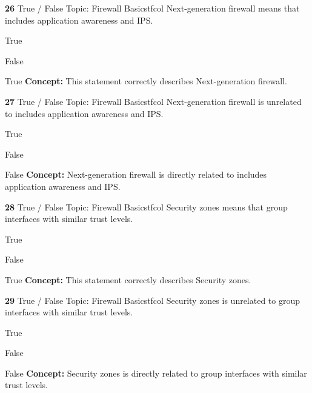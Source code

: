 \documentclass[10pt,a4paper]{article}
\begin{document}
\begin{qcard}{\color{white}\textbf{26} \hfill \small True / False \textbar{} Topic: Firewall Basics}{tfcol}
Next-generation firewall means that includes application awareness and IPS.

\begin{qoptions}
\item True
\item False
\end{qoptions}
\begin{explainbox}{True}
\textbf{Concept:} This statement correctly describes Next-generation firewall.
\end{explainbox}
\end{qcard}

\begin{qcard}{\color{white}\textbf{27} \hfill \small True / False \textbar{} Topic: Firewall Basics}{tfcol}
Next-generation firewall is unrelated to includes application awareness and IPS.

\begin{qoptions}
\item True
\item False
\end{qoptions}
\begin{explainbox}{False}
\textbf{Concept:} Next-generation firewall is directly related to includes application awareness and IPS.
\end{explainbox}
\end{qcard}

\begin{qcard}{\color{white}\textbf{28} \hfill \small True / False \textbar{} Topic: Firewall Basics}{tfcol}
Security zones means that group interfaces with similar trust levels.

\begin{qoptions}
\item True
\item False
\end{qoptions}
\begin{explainbox}{True}
\textbf{Concept:} This statement correctly describes Security zones.
\end{explainbox}
\end{qcard}

\begin{qcard}{\color{white}\textbf{29} \hfill \small True / False \textbar{} Topic: Firewall Basics}{tfcol}
Security zones is unrelated to group interfaces with similar trust levels.

\begin{qoptions}
\item True
\item False
\end{qoptions}
\begin{explainbox}{False}
\textbf{Concept:} Security zones is directly related to group interfaces with similar trust levels.
\end{explainbox}
\end{qcard}
\end{document}
